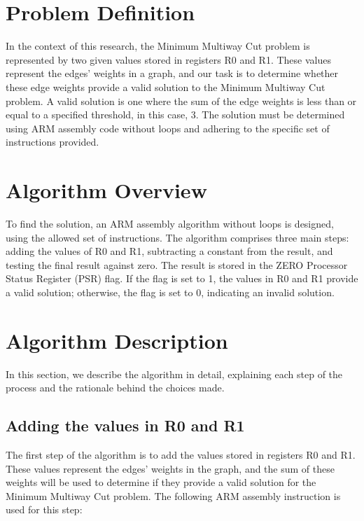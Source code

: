 \section{Problem Definition}

In the context of this research, the Minimum Multiway Cut problem is represented by two given values stored in registers R0 and R1. These values represent the edges' weights in a graph, and our task is to determine whether these edge weights provide a valid solution to the Minimum Multiway Cut problem. A valid solution is one where the sum of the edge weights is less than or equal to a specified threshold, in this case, 3. The solution must be determined using ARM assembly code without loops and adhering to the specific set of instructions provided.

\section{Algorithm Overview}

To find the solution, an ARM assembly algorithm without loops is designed, using the allowed set of instructions. The algorithm comprises three main steps: adding the values of R0 and R1, subtracting a constant from the result, and testing the final result against zero. The result is stored in the ZERO Processor Status Register (PSR) flag. If the flag is set to 1, the values in R0 and R1 provide a valid solution; otherwise, the flag is set to 0, indicating an invalid solution.

\section{Algorithm Description}

In this section, we describe the algorithm in detail, explaining each step of the process and the rationale behind the choices made.

\subsection{Adding the values in R0 and R1}

The first step of the algorithm is to add the values stored in registers R0 and R1. These values represent the edges' weights in the graph, and the sum of these weights will be used to determine if they provide a valid solution for the Minimum Multiway Cut problem. The following ARM assembly instruction is used for this step:

